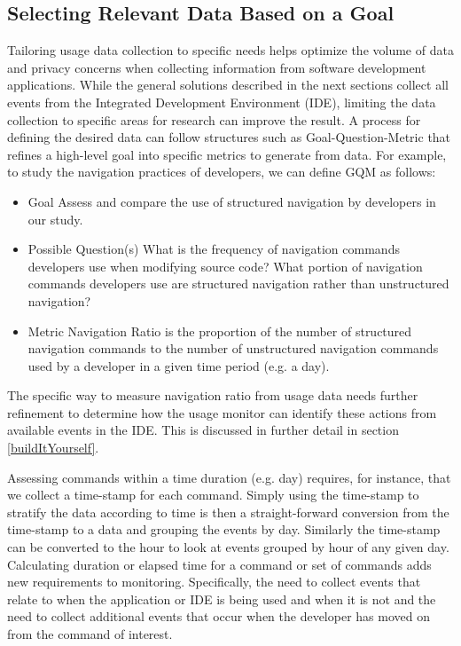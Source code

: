 \subsection{Selecting Relevant Data Based on a Goal}
\label{SelectingData}
Tailoring usage data collection to specific needs helps optimize the volume of data and privacy concerns when collecting information from software development applications.  While the general solutions described in the next sections collect all events from the Integrated Development Environment (IDE), limiting the data collection to specific areas for research can improve the result.  A process for defining the desired data can follow structures such as Goal-Question-Metric \cite{basili-GQM}  that refines a high-level goal into specific metrics to generate from data.  For example, to study the navigation practices of developers, we can define GQM as follows:
    \begin{itemize}
\item
	Goal
\subitem
	Assess and compare the use of structured navigation by developers in our study.
\item
	Possible Question(s)
\subitem
	What is the frequency of navigation commands developers use when modifying source code?
\subitem
	What portion of navigation commands developers use are structured navigation rather than unstructured navigation?
\item
	Metric
\subitem
	Navigation Ratio is the proportion of the number of structured navigation commands to the number of unstructured navigation commands used by a developer in a given time period (e.g. a day).

	    \end{itemize}

The specific way to measure navigation ratio from usage data needs further refinement to determine how the usage monitor can identify these actions from available events in the IDE. This is discussed in further detail in section \ref{buildItYourself}.

Assessing commands within a time duration (e.g. day) requires, for instance, that we collect a time-stamp for each command.  Simply using the time-stamp to stratify the data according to time is then a straight-forward conversion from the time-stamp to a data and grouping the events by day.
Similarly the time-stamp can be converted to the hour to look at events grouped by hour of any given day. Calculating duration or elapsed time for a command or set of commands adds new requirements to monitoring.  Specifically, the need to collect events that relate to when the application or IDE is being used and when it is not and the need to collect additional events that occur when the developer has moved on from the command of interest.

